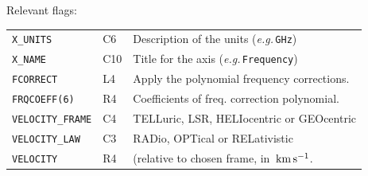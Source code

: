 \documentclass[11pt,twoside]{report}
\newcommand{\eg}{{\it e.g.\,}}
\newcommand{\kms}{{\rm\,km\,s^{-1}}}
\begin{document}
Relevant flags:\\
\begin{tabular}{lll}
   \verb+X_UNITS+ & C6 & Description of the units (\eg \verb+GHz+)\\
   \verb+X_NAME+  & C10& Title for the axis (\eg \verb+Frequency+)\\
   \verb+FCORRECT+ & L4& Apply the polynomial frequency corrections.\\
   \verb+FRQCOEFF(6)+ &R4& Coefficients of freq. correction polynomial.\\
   \verb+VELOCITY_FRAME+ & C4 & TELLuric, LSR, HELIocentric or GEOcentric\\
   \verb+VELOCITY_LAW+ & C3 & RADio, OPTical or RELativistic\\
   \verb+VELOCITY+ & R4 & (relative to chosen frame, in $\kms$.
\end{tabular}
\end{document}
